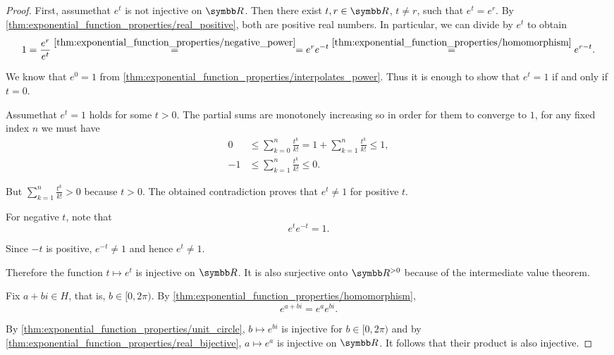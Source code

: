 \begin{proof}
   First, assume\LEM that \( e^t \) is not injective on \( \BR \). Then there exist \( t, r \in \BR \), \( t \neq r \), such that \( e^t = e^r \). By \cref{thm:exponential_function_properties/real_positive}, both are positive real numbers. In particular, we can divide by \( e^t \) to obtain
  \begin{equation*}
    1
    =
    \frac {e^r} {e^t}
    \overset {\ref{thm:exponential_function_properties/negative_power}} =
    =
    e^r e^{-t}
    \overset {\ref{thm:exponential_function_properties/homomorphism}} =
    e^{r - t}.
  \end{equation*}

  We know that \( e^0 = 1 \) from \cref{thm:exponential_function_properties/interpolates_power}. Thus it is enough to show that \( e^t = 1 \) if and only if \( t = 0 \).

  Assume\LEM that \( e^t = 1 \) holds for some \( t > 0 \). The partial sums are monotonely increasing so in order for them to converge to \( 1 \), for any fixed index \( n \) we must have
  \begin{align*}
    0 &\leq \sum_{k=0}^n \frac {t^k} {k!} = 1 + \sum_{k=1}^n \frac {t^k} {k!} \leq 1,\\
    -1 &\leq \sum_{k=1}^n \frac {t^k} {k!} \leq 0.
  \end{align*}

  But \( \sum_{k=1}^n \frac {t^k} {k!} > 0 \) because \( t > 0 \). The obtained contradiction proves that \( e^t \neq 1 \) for positive \( t \).

  For negative \( t \), note that
  \begin{equation*}
    e^t e^{-t} = 1.
  \end{equation*}

  Since \( -t \) is positive, \( e^{-t} \neq 1 \) and hence \( e^t \neq 1 \).

  Therefore the function \( t \mapsto e^t \) is injective on \( \BR \). It is also surjective onto \( \BR^{>0} \) because of the intermediate value theorem.

   Fix \( a + bi \in H \), that is, \( b \in [0, 2\pi) \). By \cref{thm:exponential_function_properties/homomorphism},
  \begin{equation*}
    e^{a + bi} = e^a e^{bi}.
  \end{equation*}

  By \cref{thm:exponential_function_properties/unit_circle}, \( b \mapsto e^{bi} \) is injective for \( b \in [0, 2\pi) \) and by \cref{thm:exponential_function_properties/real_bijective}, \( a \mapsto e^a \) is injective on \( \BR \). It follows that their product is also injective.


\end{proof}
